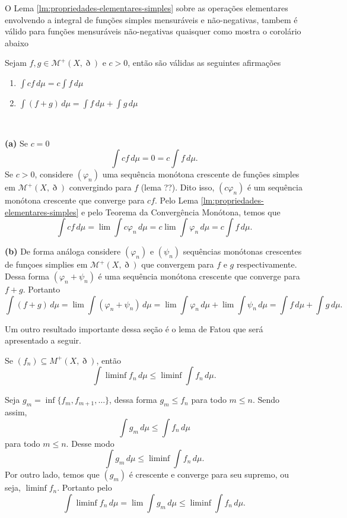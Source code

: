 \documentclass[a4paper, 11pt]{book}
\theoremstyle{definition}
\newcommand{\cM}{\mathcal{M}}
\begin{document}
O Lema \ref{lm:propriedades-elementares-simples} sobre as operações elementares envolvendo a integral de funções simples mensuráveis e não-negativas, tambem é válido para funções mensuráveis não-negativas quaisquer como mostra o corolário abaixo

\begin{cbox} \label{cl:propriedades-elementares-nao-negativa}
    Sejam $f, g \in \cM^+(X,\eth)$ e $c > 0$, então são válidas as seguintes afirmações
    \begin{enumerate}[leftmargin=*, label=\textbf{(\alph*)}]
        \item $\displaystyle \int cf \, d\mu = c \int f \,d \mu$
        \item $\displaystyle \int (f + g) \, d\mu = \int f \,d \mu + \int g \, d\mu$
    \end{enumerate}
\end{cbox}
\begin{prf}
    ~

    \textbf{(a)} Se $c = 0$
    \[
        \int c f \, d\mu = 0 = c \int f \, d\mu.
    \]
    Se $c > 0$, considere $(\varphi_n)$ uma sequência monótona crescente de funções simples em $\cM^+(X,\eth)$ convergindo para $f$ (lema ??). Dito isso, $(c\varphi_n)$ é um sequência monótona crescente que converge para $cf$. Pelo Lema \ref{lm:propriedades-elementares-simples} e pelo Teorema da Convergência Monótona, temos que
    \[
        \int cf \, d\mu = \lim \int c \varphi_n \, d\mu = c \lim \int \varphi_n \, d\mu = c \int f \, d\mu.
    \]

    \textbf{(b)} De forma análoga considere $(\varphi_n)$ e $(\psi_n)$ sequências monótonas crescentes de funçoes simplies em $\cM^+(X,\eth)$ que convergem para $f$ e $g$ respectivamente. Dessa forma $(\varphi_n + \psi_n)$ é uma sequência monótona crescente que converge para $f + g$. Portanto
    \[
        \int (f+g) \, d\mu = \lim \int (\varphi_n + \psi_n) \, d \mu = \lim \int \varphi_n \, d\mu + \lim\int \psi_n \, d\mu = \int f \, d\mu + \int g \, d\mu.
    \]
\end{prf}

Um outro resultado importante dessa seção é o lema de Fatou que será apresentado a seguir.

\begin{lbox} \label{lm:lema-de-fatou}
    Se $(f_n) \subseteq M^+ (X,\eth)$, então
    \[
        \int\liminf f_n \, d\mu\leqslant\liminf \int f_n \,d\mu.
    \]
\end{lbox}
\begin{prf}
    Seja $g_m = \inf \{ f_m, f_{m+1},\dots\}$, dessa forma $g_m \leqslant f_n$ para todo $m \leqslant n$.
    Sendo assim,
    \[
        \int g_m \, d\mu \leqslant \int f_n \, d\mu
    \]
    para todo $m \leqslant n$. Desse modo
    \[
        \int g_m \,d\mu \leqslant \liminf \int f_n \, d\mu.
    \]
    Por outro lado, temos que $(g_m)$ é crescente e converge para seu supremo, ou seja, $\liminf f_n$.
    Portanto pelo 
    \[
        \int \liminf f_n \, d\mu = \lim \int g_m \,d\mu \leqslant \liminf \int f_n\, d\mu.
    \]
\end{prf}
\end{document}
